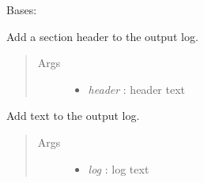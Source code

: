 \documentclass[letterpaper,10pt,english]{sphinxmanual}
\begin{document}
\begin{fulllineitems}
\label{api-doc/mosaic.misc:mosaic.utilities.mosaicLog.mosaicLog}
Bases: \href{http://docs.python.org/library/stdtypes.html\#dict}{}

\begin{fulllineitems}
\label{api-doc/mosaic.misc:mosaic.utilities.mosaicLog.mosaicLog.addLogHeader}
Add a section header to the output log.
\begin{quote}\begin{description}
\item[{Args}] \leavevmode\begin{itemize}
\item {} 
\emph{header} :    header text

\end{itemize}

\end{description}\end{quote}

\end{fulllineitems}


\begin{fulllineitems}
\label{api-doc/mosaic.misc:mosaic.utilities.mosaicLog.mosaicLog.addLogText}
Add text to the output log.
\begin{quote}\begin{description}
\item[{Args}] \leavevmode\begin{itemize}
\item {} 
\emph{log} :       log text

\end{itemize}

\end{description}\end{quote}

\end{fulllineitems}


\end{fulllineitems}
\end{document}
